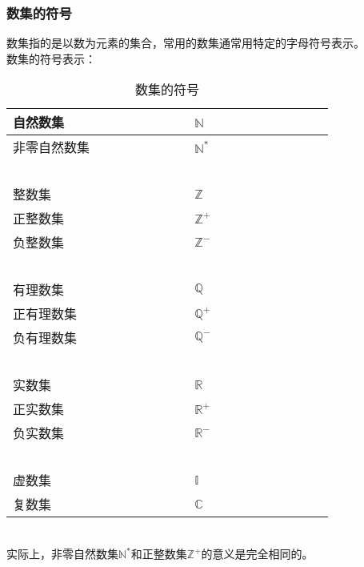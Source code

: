 \documentclass[UTF8]{ctexart}
\begin{document}
\subsubsection{数集的符号}
    数集指的是以数为元素的集合，常用的数集通常用特定的字母符号表示。\\[3mm]
    数集的符号表示：
    \begin{table}[h]
        \begin{center}
            \begin{tabular}{l|l}
                \hline
                自然数集~~~~~~~~~~~~~~~~&$\mathbb{N}$~~~~~~~~~~~~~~~~\\ \hline
                非零自然数集&$\mathbb{N^*}$\\ \hline
                ~&~\\ \hline
                整数集&$\mathbb{Z}$\\ \hline
                正整数集&$\mathbb{Z^+}$\\ \hline
                负整数集&$\mathbb{Z^-}$\\ \hline
                ~&~\\ \hline
                有理数集&$\mathbb{Q}$\\ \hline
                正有理数集&$\mathbb{Q^+}$\\ \hline
                负有理数集&$\mathbb{Q^-}$\\ \hline
                ~&~\\ \hline
                实数集&$\mathbb{R}$\\ \hline
                正实数集&$\mathbb{R^+}$\\ \hline
                负实数集&$\mathbb{R^-}$\\ \hline
                ~&~\\ \hline
                虚数集&$\mathbb{I}$\\ \hline
                复数集&$\mathbb{C}$\\ \hline
            \end{tabular}
        \end{center}
        \caption{数集的符号}
    \end{table}\\
    实际上，非零自然数集$\mathbb{N^*}$和正整数集$\mathbb{Z^+}$的意义是完全相同的。

\newpage
\end{document}

